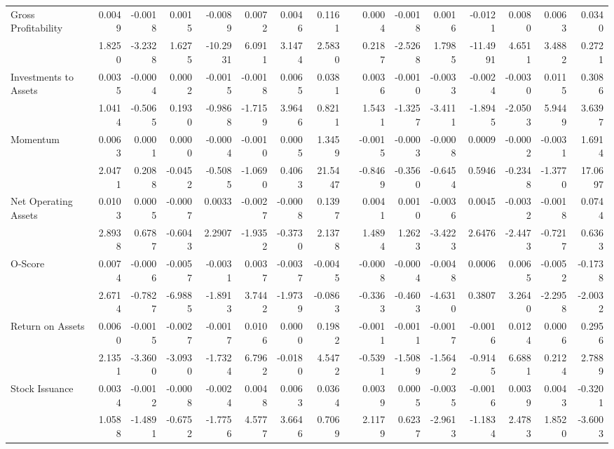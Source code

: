 \begin{sidewaystable}[htbp]
{\begin{tabular}{lrrrrrrrrrrrrrrr}
Gross Profitability & 0.0049 & -0.0018 & 0.0015 & -0.0089 & 0.0072 & 0.0046 & 0.1161 &       & 0.0004 & -0.0018 & 0.0016 & -0.0121 & 0.0080 & 0.0063 & 0.0340 \\
& 1.8250 & -3.2328 & 1.6275 & -10.2931 & 6.0911 & 3.1474 & 2.5830 &       & 0.2187 & -2.5268 & 1.7985 & -11.4991 & 4.6511 & 3.4882 & 0.2721 \\
Investments to Assets & 0.0035 & -0.0004 & 0.0002 & -0.0015 & -0.0018 & 0.0065 & 0.0381 &       & 0.0036 & -0.0010 & -0.0033 & -0.0024 & -0.0030 & 0.0115 & 0.3086 \\
& 1.0414 & -0.5065 & 0.1930 & -0.9868 & -1.7159 & 3.9646 & 0.8211 &       & 1.5431 & -1.3257 & -3.4111 & -1.8945 & -2.0503 & 5.9449 & 3.6397 \\
Momentum & 0.0063 & 0.0001 & 0.0000 & -0.0004 & -0.0010 & 0.0005 & 1.3459 &       & -0.0015 & -0.0003 & -0.0008 & 0.0009 & -0.0002 & -0.0031 & 1.6914 \\
& 2.0471 & 0.2088 & -0.0452 & -0.5085 & -1.0690 & 0.4063 & 21.5447 &       & -0.8469 & -0.3560 & -0.6454 & 0.5946 & -0.2348 & -1.3770 & 17.0697 \\
Net Operating Assets & 0.0103 & 0.0005 & -0.0007 & 0.0033 & -0.0027 & -0.0008 & 0.1397 &       & 0.0041 & 0.0010 & -0.0036 & 0.0045 & -0.0032 & -0.0018 & 0.0744 \\
& 2.8938 & 0.6787 & -0.6043 & 2.2907 & -1.9352 & -0.3730 & 2.1378 &       & 1.4894 & 1.2623 & -3.4223 & 2.6476 & -2.4473 & -0.7217 & 0.6363 \\
O-Score & 0.0074 & -0.0006 & -0.0057 & -0.0031 & 0.0037 & -0.0037 & -0.0045 &       & -0.0008 & -0.0004 & -0.0048 & 0.0006 & 0.0065 & -0.0052 & -0.1738 \\
& 2.6714 & -0.7827 & -6.9885 & -1.8913 & 3.7442 & -1.9739 & -0.0863 &       & -0.3363 & -0.4603 & -4.6310 & 0.3807 & 3.2640 & -2.2958 & -2.0032 \\
Return on Assets & 0.0060 & -0.0015 & -0.0027 & -0.0017 & 0.0106 & 0.0000 & 0.1982 &       & -0.0011 & -0.0011 & -0.0017 & -0.0016 & 0.0124 & 0.0006 & 0.2956 \\
& 2.1351 & -3.3600 & -3.0930 & -1.7324 & 6.7962 & -0.0180 & 4.5472 &       & -0.5391 & -1.5089 & -1.5642 & -0.9145 & 6.6881 & 0.2124 & 2.7889 \\
Stock Issuance & 0.0034 & -0.0012 & -0.0008 & -0.0024 & 0.0048 & 0.0063 & 0.0364 &       & 0.0039 & 0.0005 & -0.0035 & -0.0016 & 0.0039 & 0.0043 & -0.3201 \\
& 1.0588 & -1.4891 & -0.6752 & -1.7756 & 4.5777 & 3.6646 & 0.7069 &       & 2.1179 & 0.6237 & -2.9613 & -1.1834 & 2.4783 & 1.8520 & -3.6003 \\
\bottomrule
\end{tabular}%
}
\label{tab:vol-ff6}%
\end{sidewaystable}%

